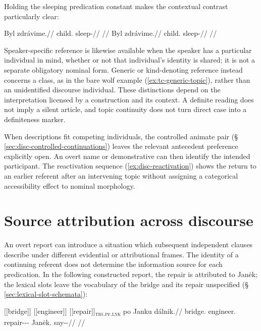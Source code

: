 Holding the sleeping predication constant makes the contextual contrast
 particularly clear:

\pex\label{ex:disc-bare-contexts}
\a
\begingl
\gla Byl zdrávime.//
\glb child.\Dir{} sleep-\Prog{}//
\glft {}
//
\endgl
\a
\begingl
\gla Byl zdrávime.//
\glb child.\Dir{} sleep-\Prog{}//
\glft {}
//
\endgl
\xe

\noindent Speaker-specific reference is likewise available when the speaker
 has a particular individual in mind, whether or not that individual's identity
 is shared; it is not a separate obligatory nominal form. Generic or
 kind-denoting reference instead concerns a class, as in the bare wolf example
 (\ref{ex:tc-generic-topic}), rather than an unidentified discourse individual.
 These distinctions depend on the interpretation licensed by a construction
 and its context. A definite reading does not imply a silent article, and
 topic continuity does not turn direct case into a definiteness marker.

When descriptions fit competing individuals, the controlled animate pair
 (§\,\ref{sec:disc-controlled-continuations}) leaves the relevant antecedent
 preference explicitly open. An overt name or demonstrative can then identify
 the intended participant. The reactivation sequence (\ref{ex:disc-reactivation})
 shows the return to an earlier referent after an intervening topic without
 assigning a categorical accessibility effect to nominal morphology.

\section{Source attribution across discourse}
\label{sec:disc-reportative-sequences}

An overt report can introduce a situation which subsequent independent
clauses describe under different evidential or attributional frames.
The identity of a continuing referent does not determine the information
source for each predication. In the following constructed report, the
repair is attributed to Janėk; the lexical slots leave the vocabulary of
the bridge and its repair unspecified
(§\,\ref{sec:lexical-slot-schemata}):

\ex\label{ex:disc-reportative-frame}%
\begingl
\gla \textnormal{[[bridge]]}\textsubscript{\Dir{}} \textnormal{[[engineer]]}\textsubscript{\Trs{}} \textnormal{[[repair]]}\textsubscript{\textsc{trs.pf.lnk}} po Janku dálnik.//
\glb bridge.\Dir{} engineer.\Trs{} repair-\Trs{}-\Pf{}-\Lnk{} \Compl{} Janėk.\Trs{} say-\Trs{}-\Pf{}//
\glft {}//
\endgl
\xe

